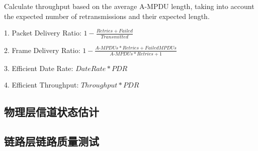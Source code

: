 Calculate throughput based on the average A-MPDU length, taking into account the expected number of retransmissions and their expected length.

1. Packet Delivery Ratio: $1-\frac{Retries+Failed}{Transmitted}$

2. Frame Delivery Ratio: $1-\frac{A\text{-}MPDUs * Retries + Failed MPDUs}{A\text{-}MPDUs * Retries+1}$

3. Efficient Date Rate: $DateRate * PDR$

4. Efficient Throughput: $Throughput * PDR$

\subsection{物理层信道状态估计}
\label{sec:phy}


\subsection{链路层链路质量测试}
\label{sec:mac}
